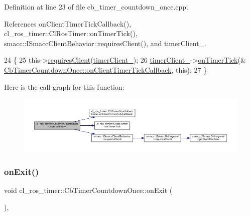 Definition at line 23 of file cb\+\_\+timer\+\_\+countdown\+\_\+once.\+cpp.



References on\+Client\+Timer\+Tick\+Callback(), cl\+\_\+ros\+\_\+timer\+::\+Cl\+Ros\+Timer\+::on\+Timer\+Tick(), smacc\+::\+I\+Smacc\+Client\+Behavior\+::requires\+Client(), and timer\+Client\+\_\+.


\begin{DoxyCode}
24 \{
25     this->\hyperlink{classsmacc_1_1ISmaccClientBehavior_a32b16e99e3b4cb289414203dc861a440}{requiresClient}(\hyperlink{classcl__ros__timer_1_1CbTimerCountdownOnce_a2a969a829fcb39abcc0380ee420e3300}{timerClient\_});
26     \hyperlink{classcl__ros__timer_1_1CbTimerCountdownOnce_a2a969a829fcb39abcc0380ee420e3300}{timerClient\_}->\hyperlink{classcl__ros__timer_1_1ClRosTimer_a7edcc057bfb5a25fe0892755137dd8da}{onTimerTick}(&
      \hyperlink{classcl__ros__timer_1_1CbTimerCountdownOnce_a2b02bbde9c9321781b70b9371b22673a}{CbTimerCountdownOnce::onClientTimerTickCallback}, \textcolor{keyword}{this});
27 \}
\end{DoxyCode}
Here is the call graph for this function\+:
\nopagebreak
\begin{figure}[H]
\begin{center}
\leavevmode
\includegraphics[width=350pt]{classcl__ros__timer_1_1CbTimerCountdownOnce_a613662c4a4106ece0ce1dee198d1aba2_cgraph}
\end{center}
\end{figure}
\mbox{\label{classcl__ros__timer_1_1CbTimerCountdownOnce_ab602b778a299b42e8cc9f4bf3da0a234}} 
\subsubsection{\texorpdfstring{on\+Exit()}{onExit()}}
{\footnotesize\ttfamily void cl\+\_\+ros\+\_\+timer\+::\+Cb\+Timer\+Countdown\+Once\+::on\+Exit (\begin{DoxyParamCaption}{ }\end{DoxyParamCaption})\hspace{0.3cm}{\ttfamily [override]}, {\ttfamily [virtual]}}



